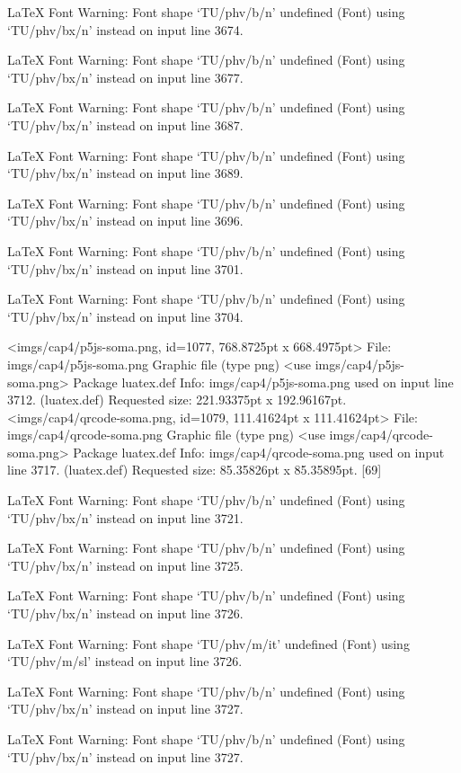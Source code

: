 LaTeX Font Warning: Font shape `TU/phv/b/n' undefined
(Font)              using `TU/phv/bx/n' instead on input line 3674.


LaTeX Font Warning: Font shape `TU/phv/b/n' undefined
(Font)              using `TU/phv/bx/n' instead on input line 3677.


LaTeX Font Warning: Font shape `TU/phv/b/n' undefined
(Font)              using `TU/phv/bx/n' instead on input line 3687.


LaTeX Font Warning: Font shape `TU/phv/b/n' undefined
(Font)              using `TU/phv/bx/n' instead on input line 3689.


LaTeX Font Warning: Font shape `TU/phv/b/n' undefined
(Font)              using `TU/phv/bx/n' instead on input line 3696.


LaTeX Font Warning: Font shape `TU/phv/b/n' undefined
(Font)              using `TU/phv/bx/n' instead on input line 3701.


LaTeX Font Warning: Font shape `TU/phv/b/n' undefined
(Font)              using `TU/phv/bx/n' instead on input line 3704.

<imgs/cap4/p5js-soma.png, id=1077, 768.8725pt x 668.4975pt>
File: imgs/cap4/p5js-soma.png Graphic file (type png)
<use imgs/cap4/p5js-soma.png>
Package luatex.def Info: imgs/cap4/p5js-soma.png  used on input line 3712.
(luatex.def)             Requested size: 221.93375pt x 192.96167pt.
<imgs/cap4/qrcode-soma.png, id=1079, 111.41624pt x 111.41624pt>
File: imgs/cap4/qrcode-soma.png Graphic file (type png)
<use imgs/cap4/qrcode-soma.png>
Package luatex.def Info: imgs/cap4/qrcode-soma.png  used on input line 3717.
(luatex.def)             Requested size: 85.35826pt x 85.35895pt.
[69]

LaTeX Font Warning: Font shape `TU/phv/b/n' undefined
(Font)              using `TU/phv/bx/n' instead on input line 3721.


LaTeX Font Warning: Font shape `TU/phv/b/n' undefined
(Font)              using `TU/phv/bx/n' instead on input line 3725.


LaTeX Font Warning: Font shape `TU/phv/b/n' undefined
(Font)              using `TU/phv/bx/n' instead on input line 3726.


LaTeX Font Warning: Font shape `TU/phv/m/it' undefined
(Font)              using `TU/phv/m/sl' instead on input line 3726.


LaTeX Font Warning: Font shape `TU/phv/b/n' undefined
(Font)              using `TU/phv/bx/n' instead on input line 3727.


LaTeX Font Warning: Font shape `TU/phv/b/n' undefined
(Font)              using `TU/phv/bx/n' instead on input line 3727.


